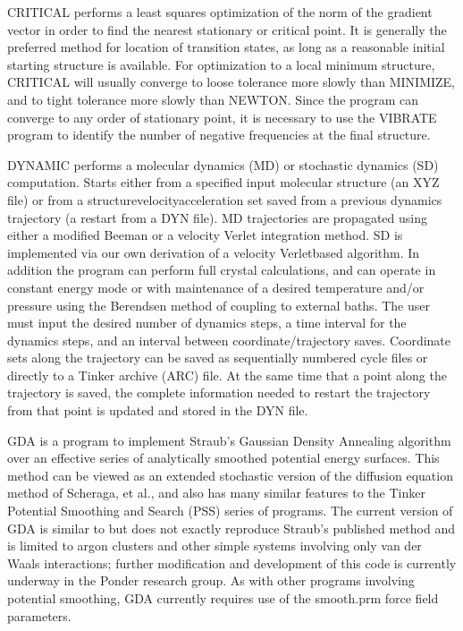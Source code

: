 \documentclass[letterpaper,11pt,english]{sphinxmanual}
\begin{document}

CRITICAL performs a least squares optimization of the norm of the gradient vector in order to find the nearest stationary or critical point. It is generally the preferred method for location of transition states, as long as a reasonable initial starting structure is available. For optimization to a local minimum structure, CRITICAL will usually converge to loose tolerance more slowly than MINIMIZE, and to tight tolerance more slowly than NEWTON. Since the program can converge to any order of stationary point, it is necessary to use the VIBRATE program to identify the number of negative frequencies at the final structure.


DYNAMIC performs a molecular dynamics (MD) or stochastic dynamics (SD) computation. Starts either from a specified input molecular structure (an XYZ file) or from a structure\sphinxhyphen{}velocity\sphinxhyphen{}acceleration set saved from a previous dynamics trajectory (a restart from a DYN file). MD trajectories are propagated using either a modified Beeman or a velocity Verlet integration method. SD is implemented via our own derivation of a velocity Verlet\sphinxhyphen{}based algorithm. In addition the program can perform full crystal calculations, and can operate in constant energy mode or with maintenance of a desired temperature and/or pressure using the Berendsen method of coupling to external baths. The user must input the desired number of dynamics steps, a time interval for the dynamics steps, and an interval between coordinate/trajectory saves. Coordinate sets along the trajectory can be saved as sequentially numbered cycle files or directly to a Tinker archive (ARC) file. At the same time that a point along the trajectory is saved, the complete information needed to restart the trajectory from that point is updated and stored in the DYN file.


GDA is a program to implement Straub’s Gaussian Density Annealing algorithm over an effective series of analytically smoothed potential energy surfaces. This method can be viewed as an extended stochastic version of the diffusion equation method of Scheraga, et al., and also has many similar features to the Tinker Potential Smoothing and Search (PSS) series of programs. The current version of GDA is similar to but does not exactly reproduce Straub’s published method and is limited to argon clusters and other simple systems involving only van der Waals interactions; further modification and development of this code is currently underway in the Ponder research group. As with other programs involving potential smoothing, GDA currently requires use of the smooth.prm force field parameters.
\end{document}
